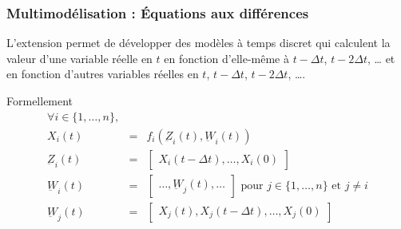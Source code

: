 \documentclass[xetex, compress, table, dvipsnames]{beamer}
\begin{document}
\begin{frame}
  \frametitle{Multimodélisation : Équations aux différences}
  \begin{alertblock}{}
    L'extension  permet de développer des
    modèles à temps discret qui calculent la valeur d'une variable
    réelle en $t$ en fonction d'elle-même à $t-\Delta t$, $t-2\Delta
    t$, \dots{} et en fonction d'autres variables réelles en $t$,
    $t-\Delta t$, $t-2\Delta t$, \dots{}.
  \end{alertblock}
  \begin{block}{Formellement}
    \begin{eqnarray*}
      \forall i \in \{1,\ldots,n\}, &~&\\
      X_i(t)&=&f_i(\underbar Z_i(t),\underbar W_i(t))\\
      \underbar Z_i(t) &=& \begin{bmatrix} X_i(t-\Delta t), \ldots, X_i(0)
      \end{bmatrix}\\
      \underbar W_i(t) &=& \begin{bmatrix} \ldots, \underbar W_{j}(t), \ldots
      \end{bmatrix}\text{ pour } j \in \{1,\ldots,n\}\text{ et }j \neq i\\
      \underbar W_j(t) &=& \begin{bmatrix} X_j(t), X_j(t-\Delta t), \ldots,
        X_j(0) \end{bmatrix}\\
    \end{eqnarray*}
  \end{block}
\end{frame}
\end{document}
